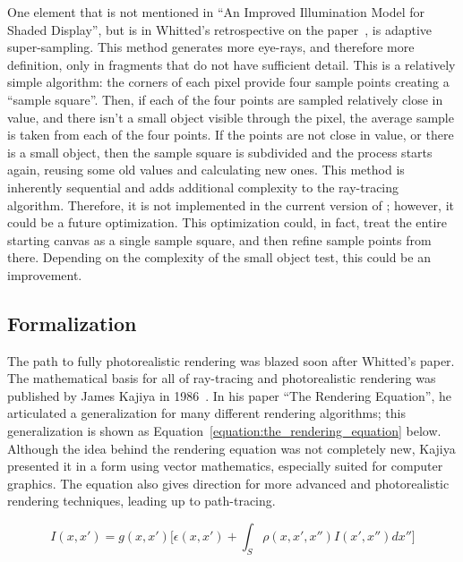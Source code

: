 One element that is not mentioned in ``An Improved Illumination Model for Shaded Display'', but is in Whitted's retrospective on the paper~\cite{whitted2018explains}, is adaptive super-sampling.
This method generates more eye-rays, and therefore more definition, only in fragments that do not have sufficient detail.
This is a relatively simple algorithm: the corners of each pixel provide four sample points creating a ``sample square''.
Then, if each of the four points are sampled relatively close in value, and there isn't a small object visible through the pixel, the average sample is taken from each of the four points.
If the points are not close in value, or there is a small object, then the sample square is subdivided and the process starts again, reusing some old values and calculating new ones.
This method is inherently sequential and adds additional complexity to the ray-tracing algorithm.
Therefore, it is not implemented in the current version of \name{}; however, it could be a future optimization.
This optimization could, in fact, treat the entire starting canvas as a single sample square, and then refine sample points from there.
Depending on the complexity of the small object test, this could be an improvement.

\subsection{Formalization}
\label{ch:relatedwork:discovery:formalization}

The path to fully photorealistic rendering was blazed soon after Whitted's paper.
The mathematical basis for all of ray-tracing and photorealistic rendering was published by James Kajiya in 1986~\cite{kajiya1986rendering}.
In his paper ``The Rendering Equation'', he articulated a generalization for many different rendering algorithms; this generalization is shown as Equation~\ref{equation:the_rendering_equation} below.
Although the idea behind the rendering equation was not completely new, Kajiya presented it in a form using vector mathematics, especially suited for computer graphics.
The equation also gives direction for more advanced and photorealistic rendering techniques, leading up to path-tracing.

\begin{equation}
\label{equation:the_rendering_equation}
  I(x, x') = g(x, x') \Big[\epsilon(x, x') + \int_{S} \rho(x, x',x'')I(x', x'')dx''\Big]
\end{equation}

